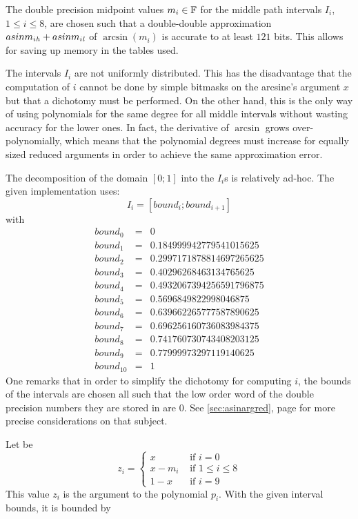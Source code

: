 The double precision midpoint values $m_i \in \mathbb {F}$ for the middle path
intervals $I_i$, $1 \leq i \leq 8$, are chosen such that a
double-double approximation $asinm_{i\mathit{h}} + asinm_{i\mathit{l}}$ of
$\arcsin\left( m_i \right)$ is accurate to at least $121$ bits. This
allows for saving up memory in the tables used.

The intervals $I_i$ are not uniformly distributed. This has the
disadvantage that the computation of $i$ cannot be done by simple
bitmasks on the arcsine's argument $x$ but that a dichotomy must be
performed. On the other hand, this is the only way of using
polynomials for the same degree for all middle intervals without
wasting accuracy for the lower ones. In fact, the derivative of
$\arcsin$ grows over-polynomially, which means that the polynomial
degrees must increase for equally sized reduced arguments in order to
achieve the same approximation error.

The decomposition of the domain $\left[0;1\right]$ into the $I_i$s is
relatively ad-hoc. The given implementation uses:
$$I_i = \left[bound_i;bound_{i+1}\right]$$
with
\begin{eqnarray*}
bound_0 & = & 0 \\
bound_1 & = & 0.184999942779541015625  \\
bound_2 & = & 0.2997171878814697265625  \\
bound_3 & = & 0.40296268463134765625  \\
bound_4 & = & 0.4932067394256591796875  \\
bound_5 & = & 0.5696849822998046875  \\
bound_6 & = & 0.639662265777587890625  \\
bound_7 & = & 0.696256160736083984375 \\
bound_8 & = & 0.741760730743408203125  \\
bound_9 & = & 0.77999973297119140625  \\
bound_{10} & = & 1
\end{eqnarray*}
One remarks that in order to simplify the dichotomy for computing $i$,
the bounds of the intervals are chosen all such that the low order
word of the double precision numbers they are stored in are $0$. See
\ref{sec:asinargred}, page \pageref{sec:asinargred} for more precise
considerations on that subject.

Let be
$$z_i = \left \lbrace \begin{array}{ll} x & \mbox{ if } i = 0 \\
x - m_i & \mbox{ if } 1 \leq i \leq 8 \\
1 - x & \mbox{ if } i = 9 \end{array} \right.$$
This value $z_i$ is the argument to the polynomial $p_i$. With the given interval bounds, it is bounded by


